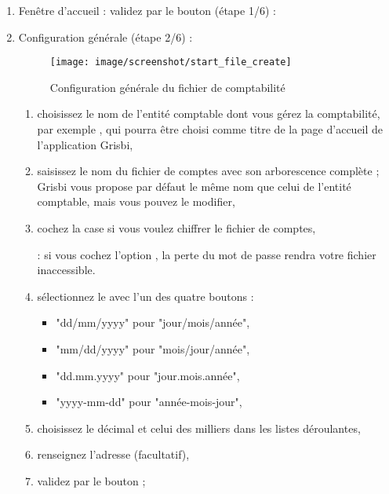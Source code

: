\begin{enumerate}
	\item Fenêtre d'accueil : validez par le bouton  (étape 1/6) :
	\item Configuration
 générale (étape 2/6)%
 :


		\begin{figure}[htbp]
		\begin{center}
		\texttt{[image: image/screenshot/start\_file\_create]}
		\end{center}
		\caption{Configuration générale du fichier de comptabilité}
		\label{start-file-create}
		\end{figure}
		
		\begin{enumerate} 
		 	\item choisissez le nom de l'entité comptable dont vous gérez la comptabilité, par exemple , qui pourra être choisi comme titre de la page d'accueil de l'application Grisbi,
			\item saisissez le nom du fichier de comptes avec son arborescence complète ; Grisbi vous propose par défaut le même nom que celui de l'entité comptable, mais vous pouvez le modifier,
			\item cochez la case  si vous voulez \gls{chiffrer} le fichier de comptes,
			
			\textcolor{red}{}: si vous cochez l'option , la perte du mot de passe rendra votre fichier inaccessible.
			
			\item sélectionnez le  avec l'un des quatre boutons :
				\begin{itemize}	
				\item[\textopenbullet] "dd/mm/yyyy" pour "jour/mois/année",
				\item[\textopenbullet] "mm/dd/yyyy" pour "mois/jour/année",
				\item[\textopenbullet] "dd.mm.yyyy" pour "jour.mois.année",
				\item[\textopenbullet] "yyyy-mm-dd" pour "année-mois-jour",
				\end{itemize}
			\item choisissez le  décimal et celui des milliers dans les listes déroulantes,
			 \item renseignez l'adresse (facultatif),
			 \item  validez par le bouton  ;
		\end{enumerate}
		

\end{enumerate}
